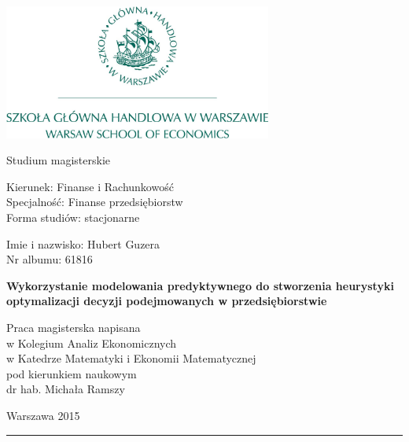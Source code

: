 \documentclass[polish, twoside, 12pt, a4paper]{article}
\theoremstyle{definition}
\theoremstyle{plain}
\theoremstyle{remark}
\begin{document}
\begin{titlepage}
\centering

\includegraphics[width=0.66\textwidth]{logo.JPG}

\vspace*{0.5cm}
Studium magisterskie\\
\begin{flushleft}
Kierunek: Finanse i Rachunkowość\\
Specjalność: Finanse przedsiębiorstw\\
Forma studiów: stacjonarne
\end{flushleft}

\vspace*{.5cm}
\rule{0cm}{1cm}\hfill
\begin{minipage}{9cm}
Imie i nazwisko: Hubert Guzera\\
Nr albumu: 61816
\end{minipage}

\vspace*{1cm}
\begin{minipage}{12cm}
\centering
\Large
\textbf{Wykorzystanie modelowania predyktywnego do stworzenia heurystyki optymalizacji decyzji podejmowanych w przedsiębiorstwie}
\end{minipage}

\vspace*{2cm}
\rule{0cm}{1cm}\hfill
\begin{minipage}{9cm}
Praca magisterska napisana\\
w Kolegium Analiz Ekonomicznych\\
w Katedrze Matematyki i Ekonomii Matematycznej\\
pod kierunkiem naukowym\\
dr hab. Michała Ramszy
\end{minipage}

\vfill
Warszawa 2015
\end{titlepage}

\rule{1ex}{0ex}\clearpage
\end{document}
